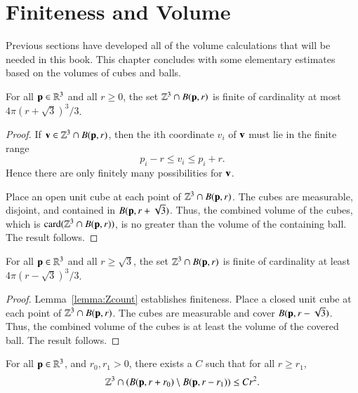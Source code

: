 \section{Finiteness and Volume}

Previous sections have developed all of the volume calculations that will
be needed in this book.  This chapter concludes with some 
elementary estimates based on the volumes of  cubes and balls.

\begin{lemma}
For all ${\mathbf p}\in\mathbb{R}^3$ and all $r\ge 0$, the set
$\mathbb{Z}^3\cap B({\mathbf p},r)$ is finite of cardinality at most
$4\pi (r+\sqrt3)^3/3$.
%
\end{lemma}

\begin{proof}  If ${\mathbf v}\in\mathbb{Z}^3\cap B({\mathbf p},r)$, then the ith
coordinate $v_i$ of ${\mathbf v}$ must lie in the finite range
\begin{displaymath}
p_i - r \le v_i \le p_i + r.
\end{displaymath}
Hence there are only finitely many possibilities for ${\mathbf v}$.


Place an open unit cube at each point of $\mathbb{Z}^3\cap B({\mathbf p},r)$.
The cubes are measurable, disjoint, and contained in
$B({\mathbf p},r+\sqrt3)$.  Thus, the combined volume of the cubes, which is
${\operatorname{card}}(\mathbb{Z}^3\cap B({\mathbf p},r))$,  is no greater than the volume of the
containing ball.  The result follows.
\end{proof}

\begin{lemma}
For all ${\mathbf p}\in\mathbb{R}^3$ and all $r\ge\sqrt3$, the set
$\mathbb{Z}^3\cap B({\mathbf p},r)$ is finite of cardinality at least
$4\pi (r-\sqrt3)^3/3$.
\end{lemma}

\begin{proof} Lemma~\ref{lemma:Zcount} establishes finiteness.  Place
a closed unit cube at each point of $\mathbb{Z}^3\cap B({\mathbf p},r)$.  The
cubes are measurable and cover $B({\mathbf p},r-\sqrt3)$.  Thus, the combined
volume of the cubes is at least the volume of the covered ball.  The
result follows.
\end{proof}

\begin{lemma}
For all ${\mathbf p}\in\mathbb{R}^3$, and $r_0,r_1>0$, there exists a $C$ such
that for all $r\ge r_1$, 
\begin{displaymath}
\mathbb{Z}^3 \cap (B({\mathbf p},r+r_0) \setminus B({\mathbf p},r-r_1)) \le C r^2.
\end{displaymath}
\end{lemma}

